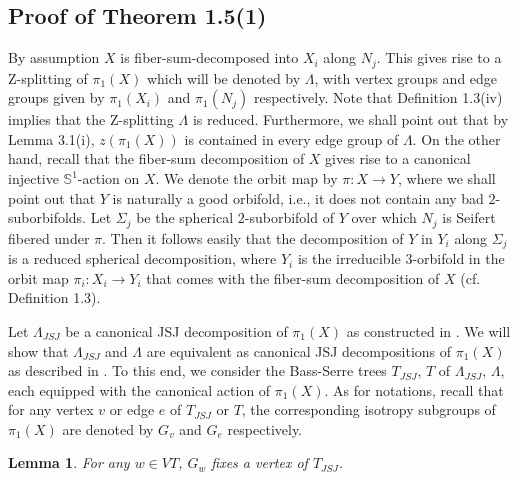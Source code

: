 \documentclass[11pt]{amsart}
\theoremstyle{plain}
\numberwithin{theorem}{section}
\newtheorem{lemma}[theorem]{Lemma}
\theoremstyle{definition}
\begin{document}
\subsection{Proof of Theorem 1.5(1)}
By assumption $X$ is fiber-sum-decomposed into $X_i$ along $N_j$. This gives rise to a Z-splitting
of $\pi_1(X)$ which will be denoted by $\Lambda$, with vertex groups and edge groups given
by $\pi_1(X_i)$ and $\pi_1(N_j)$ respectively. Note that Definition 1.3(iv) implies that the
Z-splitting $\Lambda$ is reduced. Furthermore, we shall point out that by Lemma 3.1(i), 
$z(\pi_1(X))$ is contained in every edge group of $\Lambda$. On the other hand, recall that the 
fiber-sum decomposition of $X$ gives rise to a canonical injective ${{\mathbb S}}^1$-action on $X$. We
denote the orbit map by $\pi:X\rightarrow Y$, where we shall point out that $Y$ is naturally a good 
orbifold, i.e., it does not contain any bad $2$-suborbifolds. Let $\Sigma_j$ be the spherical 
$2$-suborbifold of $Y$ over which $N_j$ is Seifert fibered under $\pi$. Then it follows easily that the decomposition of $Y$ in $Y_i$ along $\Sigma_j$ is a reduced spherical decomposition, where 
$Y_i$ is the irreducible $3$-orbifold in the orbit map $\pi_i: X_i\rightarrow Y_i$ that comes with the
fiber-sum decomposition of $X$ (cf. Definition 1.3). 

Let $\Lambda_{JSJ}$ be a canonical JSJ decomposition of $\pi_1(X)$ as constructed 
in \cite{RipS}. We will show that $\Lambda_{JSJ}$ and
$\Lambda$ are equivalent as canonical JSJ decompositions of $\pi_1(X)$
as described in \cite{RipS}. To this end, 
we consider the Bass-Serre trees $T_{JSJ}$, $T$ of $\Lambda_{JSJ}$, $\Lambda$, each equipped
with the canonical action of $\pi_1(X)$. As for notations, recall that for any vertex $v$ or edge 
$e$ of $T_{JSJ}$ or $T$, the corresponding isotropy subgroups of $\pi_1(X)$ are denoted by 
$G_v$ and $G_e$ respectively. 

\begin{lemma}
For any $w\in VT$, $G_w$ fixes a vertex of $T_{JSJ}$. 
\end{lemma}
\end{document}
